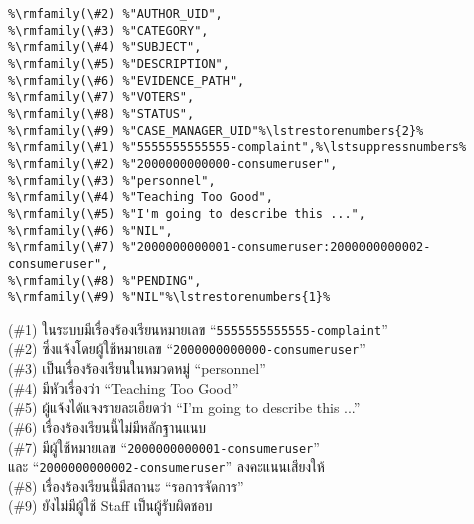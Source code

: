 \begin{minipage}{\textwidth}

\begin{lstlisting}[caption={\texttt{data/issues/complaints/complaints.csv}},breakatwhitespace=false,breaklines=false]
%\rmfamily(\#1) %"COMPLAINT_ID",%\lstsuppressnumbers%
%\rmfamily(\#2) %"AUTHOR_UID",
%\rmfamily(\#3) %"CATEGORY",
%\rmfamily(\#4) %"SUBJECT",
%\rmfamily(\#5) %"DESCRIPTION",
%\rmfamily(\#6) %"EVIDENCE_PATH",
%\rmfamily(\#7) %"VOTERS",
%\rmfamily(\#8) %"STATUS",
%\rmfamily(\#9) %"CASE_MANAGER_UID"%\lstrestorenumbers{2}%
%\rmfamily(\#1) %"5555555555555-complaint",%\lstsuppressnumbers%
%\rmfamily(\#2) %"2000000000000-consumeruser",
%\rmfamily(\#3) %"personnel",
%\rmfamily(\#4) %"Teaching Too Good",
%\rmfamily(\#5) %"I'm going to describe this ...",
%\rmfamily(\#6) %"NIL",
%\rmfamily(\#7) %"2000000000001-consumeruser:2000000000002-consumeruser",
%\rmfamily(\#8) %"PENDING",
%\rmfamily(\#9) %"NIL"%\lstrestorenumbers{1}%
\end{lstlisting}

\begin{description}[labelwidth=*]
    \item[$ \Rightarrow $] (\#1) ในระบบมีเรื่องร้องเรียนหมายเลข ``\texttt{5555555555555-complaint}''\\
(\#2) ซึ่งแจ้งโดยผู้ใช้หมายเลข ``\texttt{2000000000000-consumeruser}''\\
(\#3) เป็นเรื่องร้องเรียนในหมวดหมู่ ``personnel''\\
(\#4) มีหัวเรื่องว่า ``Teaching Too Good''\\
(\#5) ผู้แจ้งได้แจงรายละเอียดว่า ``I'm going to describe this ...''\\
(\#6) เรื่องร้องเรียนนี้ไม่มีหลักฐานแนบ\\
(\#7) มีผู้ใช้หมายเลข ``\texttt{2000000000001-consumeruser}''\\
\hspace{4ex}และ ``\texttt{2000000000002-consumeruser}'' ลงคะแนนเสียงให้\\
(\#8) เรื่องร้องเรียนนี้มีสถานะ ``รอการจัดการ''\\
(\#9) ยังไม่มีผู้ใช้ Staff เป็นผู้รับผิดชอบ
\end{description}
\end{minipage}

\clearpage

\vspace{3\baselineskip}


